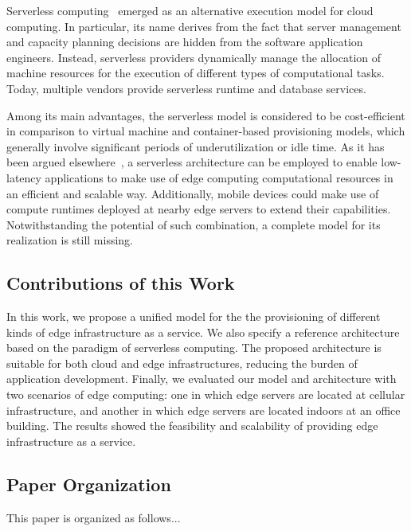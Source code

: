 Serverless computing~\cite{} emerged as an alternative execution model for cloud computing. In particular, its name derives from the fact that server management and capacity planning decisions are hidden from the software application engineers. Instead, serverless providers dynamically manage the allocation of machine resources for the execution of different types of computational tasks. Today, multiple vendors provide serverless runtime and database services. 

Among its main advantages, the serverless model is considered to be cost-efficient in comparison to virtual machine and container-based provisioning models, which generally involve significant periods of underutilization or idle time. As it has been argued elsewhere~\cite{ESOCC'17}, a serverless architecture can be employed to enable low-latency applications to make use of edge computing computational resources in an efficient and scalable way. Additionally, mobile devices could make use of compute runtimes deployed at nearby edge servers to extend their capabilities. Notwithstanding the potential of such combination, a complete model for its realization is still missing. 

\subsection{Contributions of this Work}

In this work, we propose a unified model for the the provisioning of different kinds of edge infrastructure as a service. We also specify a reference architecture based on the paradigm of serverless computing. The proposed architecture is suitable for both cloud and edge infrastructures, reducing the burden of application development. Finally, we evaluated our model and architecture with two scenarios of edge computing: one in which edge servers are located at cellular infrastructure, and another in which edge servers are located indoors at an office building. The results showed the feasibility and scalability of providing edge infrastructure as a service.

\subsection{Paper Organization}

This paper is organized as follows...




